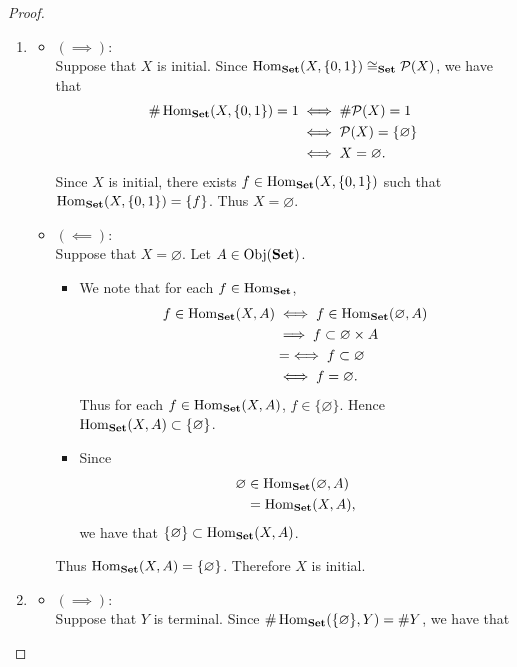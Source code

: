\documentclass{book}
\begin{document}
	\begin{proof}\
		\begin{enumerate}
			\item 
			\begin{itemize}
				\item $(\implies)$: \\
				Suppose that $X$ is initial. Since $\operatorname{Hom}_{\text{\textbf{Set}}}(X, \{0,1\}) \cong_{\text{\textbf{Set}}} \mathcal{P}(X)$, we have that  
				\begin{align*}
					\# \operatorname{Hom}_{\text{\textbf{Set}}}(X, \{0,1\}) = 1
					& \iff \# \mathcal{P}(X) = 1 \\
					& \iff \mathcal{P}(X) = \{\varnothing\} \\
					& \iff X = \varnothing.
				\end{align*}
				Since $X$ is initial, there exists $f \in \operatorname{Hom}_{\text{\textbf{Set}}}(X, \{0,1\})$ such that $\operatorname{Hom}_{\text{\textbf{Set}}}(X, \{0,1\}) = \{f\}$. Thus $X = \varnothing$. 
				\item $(\impliedby)$: \\
				Suppose that $X = \varnothing$. Let $A \in \operatorname{Obj}(\text{\textbf{Set}})$. 
				\begin{itemize}
					\item We note that for each $f \in \operatorname{Hom}_{\text{\textbf{Set}}}$,
					\begin{align*}
						f \in \operatorname{Hom}_{\text{\textbf{Set}}}(X, A) 
						& \iff f \in \operatorname{Hom}_{\text{\textbf{Set}}}(\varnothing, A) \\
						& \implies f \subset \varnothing \times A \\
						& = \iff f \subset \varnothing \\
						& \iff f = \varnothing.
					\end{align*}
					Thus for each $f \in \operatorname{Hom}_{\text{\textbf{Set}}}(X, A)$, $f \in \{\varnothing\}$. Hence $\operatorname{Hom}_{\text{\textbf{Set}}}(X, A) \subset \{\varnothing\}$. 
					\item Since  
					\begin{align*}
						\varnothing 
						& \in \operatorname{Hom}_{\text{\textbf{Set}}}(\varnothing, A) \\
						& = \operatorname{Hom}_{\text{\textbf{Set}}}(X, A),
					\end{align*}
					we have that $\{\varnothing\} \subset \operatorname{Hom}_{\text{\textbf{Set}}}(X, A)$.
				\end{itemize} 
				Thus $\operatorname{Hom}_{\text{\textbf{Set}}}(X, A) = \{\varnothing\}$. Therefore $X$ is initial.
			\end{itemize}
			\item 
			\begin{itemize}
				\item $(\implies)$: \\
				Suppose that $Y$ is terminal. Since $\# \operatorname{Hom}_{\text{\textbf{Set}}}(\{\varnothing\}, Y) = \# Y$, we have that 

\end{itemize}
\end{enumerate}
\end{proof}
\end{document}
